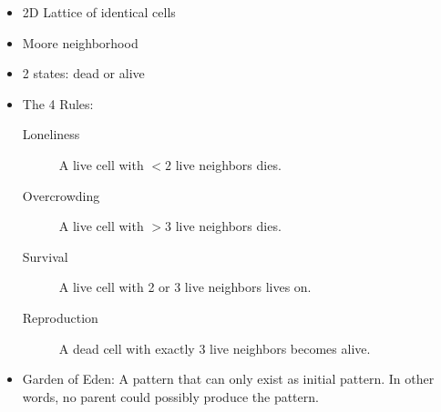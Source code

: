 \begin{itemize}
    \item 2D Lattice of identical cells
    \item Moore neighborhood
    \item 2 states: dead or alive
    \item The 4 Rules:
    \begin{description}
        \item[Loneliness] A live cell with $<2$ live neighbors dies.
        \item[Overcrowding] A live cell with $>3$ live neighbors dies.
        \item[Survival] A live cell with 2 or 3 live neighbors lives on.
        \item[Reproduction] A dead cell with exactly 3 live neighbors becomes alive.
    \end{description}
    \item Garden of Eden: A pattern that can only exist as initial pattern. In other
words, no parent could possibly produce the pattern.
\end{itemize}

\vspace{1cm}
